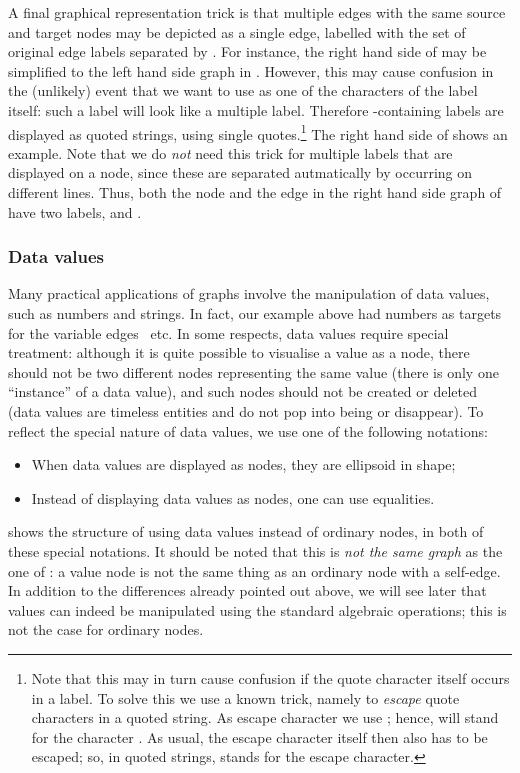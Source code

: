 A final graphical representation trick is that multiple edges with the same
source and target nodes may be depicted as a single edge, labelled with the set
of original edge labels separated by \quo{\sepChar}. For instance, the right
hand side of  may be simplified to the left hand side
graph in . However, this may cause confusion in the
(unlikely) event that we want to use \quo{\sepChar} as one of the characters of
the label itself: such a label will look like a multiple label. Therefore
\quo{\sepChar}-containing labels are displayed as quoted strings, using single
quotes.\footnote{Note that this may in turn cause confusion if the quote
character itself occurs in a label. To solve this we use a known trick, namely
to \emph{escape} quote characters in a quoted string. As escape character we
use \quo\escChar; hence, \quo{\escChar\quoChar} will stand for the character
\quo\quoChar. As usual, the escape character itself then also has to be
escaped; so, in quoted strings, \quo{\escChar\escChar} stands for the escape
character.} The right hand side of  shows an example. Note
that we do \emph{not} need this trick for multiple labels that are displayed on
a node, since these are separated autmatically by occurring on different lines.
Thus, both the node and the edge in the right hand side graph of
 have two labels,  and .

%
%

\subsubsection{Data values}

Many practical applications of graphs involve the manipulation of data values,
such as numbers and strings. In fact, our example above had numbers as targets
for the variable edges \xx\ etc. In some respects, data values require
special treatment: although it is quite possible to visualise a value as a node,
there should not be two different nodes representing the same value (there is
only one ``instance'' of a data value), and such nodes should not be created or
deleted (data values are timeless entities and do not pop into being or
disappear). To reflect the special nature of data values, we use one of the
following notations:
%
\begin{itemize}\noitemsep
\item When data values are displayed as nodes, they are ellipsoid in shape;
\item Instead of displaying data values as nodes, one can use equalities.
\end{itemize}
%
 shows the structure of  using data
values instead of ordinary nodes, in both of these special notations. It should
be noted that this is \emph{not the same graph} as the one of
: a value node is not the same thing as an ordinary node
with a self-edge. In addition to the differences already pointed out above, we
will see later that values can indeed be manipulated using the standard
algebraic operations; this is not the case for ordinary nodes.

